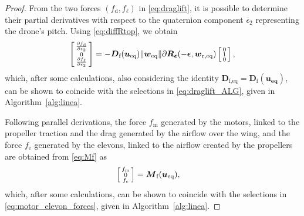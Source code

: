 \begin{proof}
From the two forces $(f_{\text{d}} , f_{\ell})$ in \eqref{eq:draglift}, it is possible to determine their partial derivatives with respect to the quaternion component $\overline \epsilon_2$ representing the drone's pitch. Using \eqref{eq:diffRtop}, we obtain
\begin{align}
    \left[ \begin{smallmatrix}\frac{\partial  f_{\text{d}}  }{\partial \epsilon_{2}} \\ 0 \\ \frac{\partial  f_{\ell}  }{\partial \epsilon_{2}} \end{smallmatrix} \right] = - \boldsymbol{D}_{\text{f}}(\boldsymbol{u_{\text{eq}}})  \lVert \boldsymbol{w}_{\mathrm{eq}} \rVert \partial \boldsymbol{R}_{\boldsymbol{ \epsilon}}( -\boldsymbol{ \epsilon}, \boldsymbol{w}_{\mathrm{r,eq}}) \left[ \begin{smallmatrix}0\\ 1\\ 0 \end{smallmatrix} \right],
\end{align}
which, after some calculations, 
also considering the identity $\boldsymbol{D}_{\text{f,eq}} = \boldsymbol{D}_{\text{f}}(\boldsymbol{u_{\text{eq}}})$,
can be shown to coincide with the selections in \eqref{eq:draglift_ALG}, given in Algorithm~\ref{alg:linea}.

Following parallel derivations, the force
$f_{\text{m}}$ generated by the motors, linked to the propeller traction and the drag generated by the airflow over the wing, and the force $f_{\text{e}}$ generated by the elevons, linked to the airflow created by the propellers are obtained from \eqref{eq:Mf} as
\begin{align}
\label{eq:motor_el}
    \left[ \begin{smallmatrix} f_{\text{m}}  \\ 0 \\ f_{\text{e}}  \end{smallmatrix} \right] &= \boldsymbol{M}_{\text{f}}(\boldsymbol{u_{\text{eq}}}) ,
\end{align}
which, after some calculations, can be shown to coincide with the selections in \eqref{eq:motor_elevon_forces}, given in Algorithm~\ref{alg:linea}.


\end{proof}

